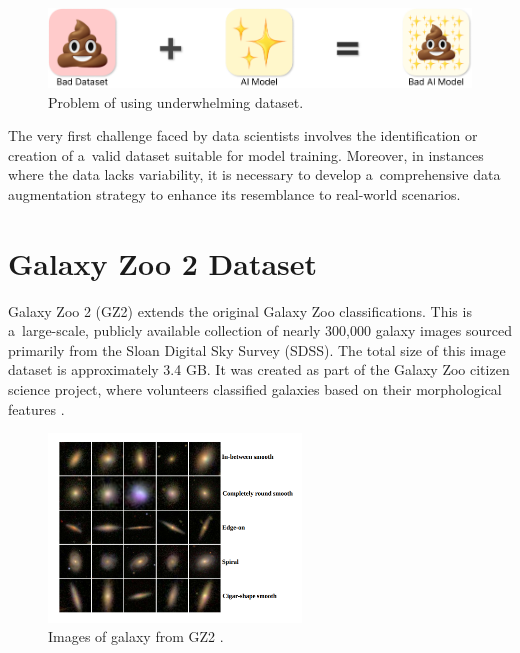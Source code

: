 \begin{figure}[htbp]
    \centering
    \includegraphics[width=0.8\linewidth]{obrazky-figures/03-dataset/bad-ds.png}
    \caption{Problem of using underwhelming dataset.}
    \label{fig:bad-ds}
\end{figure}

The very first challenge faced by data scientists involves the identification or creation of a~valid dataset suitable for model training. Moreover, in instances where the data lacks variability, it is necessary to develop a~comprehensive data augmentation strategy to enhance its resemblance to real-world scenarios.

\section{Galaxy Zoo 2 Dataset}
\label{sec:gz2-dataset}

Galaxy Zoo 2 (GZ2) extends the original Galaxy Zoo classifications. This is a~large-scale, publicly available collection of nearly 300,000 galaxy images sourced primarily from the Sloan Digital Sky Survey (SDSS). The total size of this image dataset is approximately 3.4 GB. It was created as part of the Galaxy Zoo citizen science project, where volunteers classified galaxies based on their morphological features \cite{Willett_2013}.

\begin{figure}[htbp]
    \centering
    \includegraphics[width=0.6\textwidth]{obrazky-figures/03-dataset/gz2-images.png}
    \caption{Images of galaxy from GZ2 \cite{cao2024galaxy}.}
    \label{fig:gz2-images}
\end{figure}

